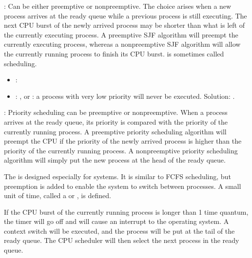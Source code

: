     \par {}: Can be either preemptive or nonpreemptive. The choice arises when a new process arrives at the ready queue while a previous process is still executing. The next CPU burst of the newly arrived process may be shorter than what is left of the currently executing process. A preemptive SJF algorithm will preempt the currently executing process, whereas a nonpreemptive SJF algorithm will allow the currently running process to finish its CPU burst.  is sometimes called  scheduling.
    
    \par {}
    \begin{itemize}
      \item {}:
      \item {}: , or : a process with very low priority will never be executed. Solution: .
    \end{itemize}


    \par {}: Priority scheduling can be  preemptive or nonpreemptive. When a process arrives at the ready queue, its priority is compared with the priority of the currently running process. A preemptive priority scheduling algorithm will preempt the CPU if the priority of the newly arrived process is higher than the priority of the currently running process. A nonpreemptive priority scheduling algorithm will simply put the new process at the head of the ready queue.

    \par The  is designed especially for  systems. It is similar to FCFS scheduling, but preemption is added to enable the system to switch between processes. A small unit of time, called a  or , is defined.
    \par If the CPU burst of the currently running process is longer than 1 time quantum, the timer will go off and will cause an interrupt to the operating system. A context switch will be executed, and the process will be put at the tail of the ready queue. The CPU scheduler will then select the next process in the ready queue.

